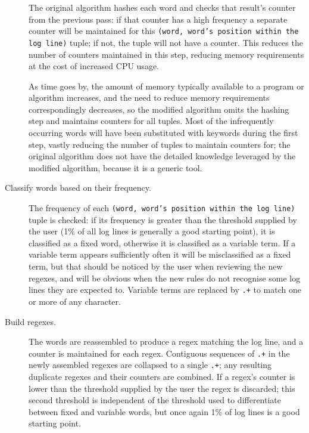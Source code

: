 \begin{description}
        The original algorithm hashes each word and checks that result's
        counter from the previous pass: if that counter has a high
        frequency a separate counter will be maintained for this
        \texttt{(word, word's position within the log line)} tuple; if not,
        the tuple will not have a counter.  This reduces the number of
        counters maintained in this step, reducing memory requirements at
        the cost of increased CPU usage.

        As time goes by, the amount of memory typically available to a
        program or algorithm increases, and the need to reduce memory
        requirements correspondingly decreases, so the modified algorithm
        omits the hashing step and maintains counters for all tuples.  Most
        of the infrequently occurring words will have been substituted with
        keywords during the first step, vastly reducing the number of
        tuples to maintain counters for; the original algorithm does not
        have the detailed knowledge leveraged by the modified algorithm,
        because it is a generic tool.

    \item [Classify words based on their frequency.]  The frequency of each
        \texttt{(word, word's position within the log line)} tuple is
        checked: if its frequency is greater than the threshold supplied by
        the user (1\% of all log lines is generally a good starting point),
        it is classified as a fixed word, otherwise it is classified as a
        variable term.  If a variable term appears sufficiently often it
        will be misclassified as a fixed term, but that should be noticed
        by the user when reviewing the new regexes, and will be obvious
        when the new rules do not recognise some log lines they are
        expected to.  Variable terms are replaced by \texttt{.+} to match
        one or more of any character.

    \item [Build regexes.]  The words are reassembled to produce a regex
        matching the log line, and a counter is maintained for each regex.
        Contiguous sequences of \texttt{.+} in the newly assembled regexes
        are collapsed to a single \texttt{.+}; any resulting duplicate
        regexes and their counters are combined.  If a regex's counter is
        lower than the threshold supplied by the user the regex is
        discarded; this second threshold is independent of the threshold
        used to differentiate between fixed and variable words, but once
        again 1\% of log lines is a good starting point.


\end{description}
